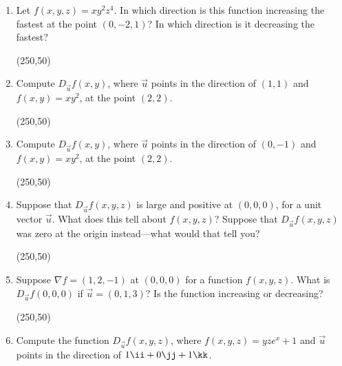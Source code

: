 \documentclass[12pt]{article}
\begin{document}
\begin{enumerate}[label=\arabic*.,start=2,leftmargin=*,itemsep=0pt]
\vfill
\begin{flushright}
\framebox(250,50){}
\end{flushright}

\newpage

\item Let $f(x,y,z)=xy^2z^4$. In which direction is this function increasing
the fastest at the point $(0,-2,1)$? In which direction is it decreasing the
fastest?

\vfill
\begin{flushright}
\framebox(250,50){}
\end{flushright}

\item Compute $D_{\vec{u}}f(x,y)$, where $\vec{u}$ points in the direction of
$(1,1)$ and $f(x,y)=xy^2$, at the point $(2,2)$.

\vfill
\begin{flushright}
\framebox(250,50){}
\end{flushright}

\newpage

\item Compute $D_{\vec{u}}f(x,y)$, where $\vec{u}$ points in the direction of
$(0,-1)$ and $f(x,y)=xy^2$, at the point $(2,2)$.

\vfill
\begin{flushright}
\framebox(250,50){}
\end{flushright}

\item Suppose that $D_{\vec{u}}f(x,y,z)$ is large and positive at $(0,0,0)$,
for a unit vector $\vec{u}$. What does this tell about $f(x,y,z)$? Suppose that
$D_{\vec{u}}f(x,y,z)$ was zero at the origin instead---what would that tell
you?

\vfill
\begin{flushright}
\framebox(250,50){}
\end{flushright}

\newpage

\item Suppose $\nabla f=(1,2,-1)$ at $(0,0,0)$ for a function $f(x,y,z)$.
What is $D_{\vec{u}}f(0,0,0)$ if $\vec{u}=(0,1,3)$? Is the function increasing
or decreasing?

\vfill
\begin{flushright}
\framebox(250,50){}
\end{flushright}

\item Compute the function $D_{\vec{u}}f(x,y,z)$, where
$f(x,y,z)=yze^x+1$ and $\vec{u}$ points in the direction of
$1\ii+0\jj+1\kk$.


\end{enumerate}
\end{document}

